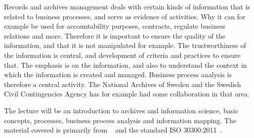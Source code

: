 Records and archives management deals with certain kinds of information that is 
related to business processes, and serve as evidence of activities.
Why it can for example be used for accountability purposes, contracts, regulate 
business relations and more.
Therefore it is important to ensure the quality of the information, and that it 
is not manipulated for example.
The trustworthiness of the information is central, and development of criteria 
and practices to ensure that.
The emphasis is on the information, and also to understand the context in which 
the information is created and managed.
Business process analysis is therefore a central activity.
The National Archives of Sweden and the Swedish Civil Contingencies Agency has 
for example had some collaboration in that area.

The lecture will be an introduction to archives and information science, basic 
concepts, processes, business process analysis and information mapping.
The material covered is primarily from ~\cite{infokartl} 
and the standard ISO 30300:2011~\cite{ISO30300:2011}.
